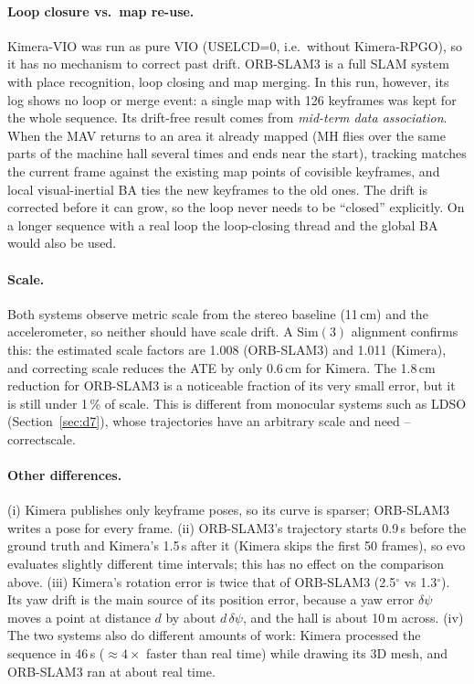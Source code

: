 \documentclass[11pt,a4paper]{article}
\DeclareRobustCommand{\code}[1]{\begingroup\ttfamily\codebreaks#1\endgroup}
\newcommand{\codebreaks}{\renewcommand{\_}{\textunderscore\allowbreak}}
\begin{document}
\paragraph{Loop closure vs.\ map re-use.} Kimera-VIO was run as pure VIO (\code{USE\_LCD=0},
i.e.\ without Kimera-RPGO), so it has no mechanism to correct past drift. ORB-SLAM3 is a full
SLAM system with place recognition, loop closing and map merging. In this run, however, its
log shows no loop or merge event: a single map with 126 keyframes was kept for the whole
sequence. Its drift-free result comes from \emph{mid-term data association}. When the MAV
returns to an area it already mapped (\code{MH\_01} flies over the same parts of the machine
hall several times and ends near the start), tracking matches the current frame against the
existing map points of covisible keyframes, and local visual-inertial BA ties the new keyframes
to the old ones. The drift is corrected before it can grow, so the loop never needs to be
``closed'' explicitly. On a longer sequence with a real loop the loop-closing thread and the
global BA would also be used.

\paragraph{Scale.} Both systems observe metric scale from the stereo baseline (11\,cm) and the
accelerometer, so neither should have scale drift. A $\mathrm{Sim}(3)$ alignment confirms this:
the estimated scale factors are 1.008 (ORB-SLAM3) and 1.011 (Kimera), and correcting scale
reduces the ATE by only 0.6\,cm for Kimera. The 1.8\,cm reduction for ORB-SLAM3 is a
noticeable fraction of its very small error, but it is still under 1\,\% of scale. This is
different from monocular systems such as LDSO (Section~\ref{sec:d7}), whose trajectories have
an arbitrary scale and need \code{--correct\_scale}.

\paragraph{Other differences.} (i) Kimera publishes only keyframe poses, so its curve is
sparser; ORB-SLAM3 writes a pose for every frame. (ii) ORB-SLAM3's trajectory starts
0.9\,s before the ground truth and Kimera's 1.5\,s after it (Kimera skips the first 50
frames), so evo evaluates slightly different time intervals; this has no effect on the
comparison above. (iii) Kimera's rotation error is twice that of ORB-SLAM3 (2.5$^\circ$ vs
1.3$^\circ$). Its yaw drift is the main source of its position error, because a yaw error
$\delta\psi$ moves a point at distance $d$ by about $d\,\delta\psi$, and the hall is about
10\,m across. (iv) The two systems also do different amounts of work: Kimera processed the
sequence in 46\,s ($\approx 4\times$ faster than real time) while drawing its 3D mesh, and
ORB-SLAM3 ran at about real time.
\end{document}

